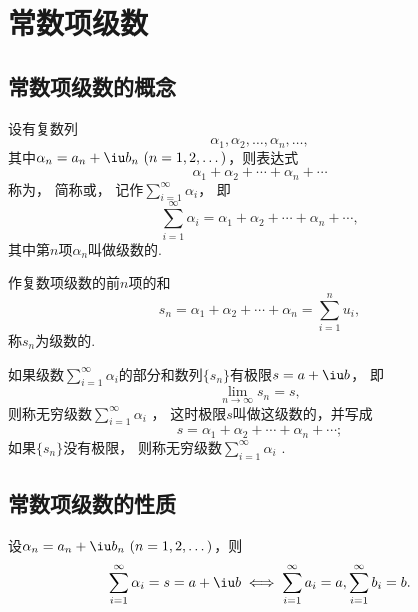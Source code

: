 \section{常数项级数}
\subsection{常数项级数的概念}
\begin{definition}
设有复数列\begin{equation*}
	\alpha_1,\alpha_2,\dotsc,\alpha_n,\dotsc,
\end{equation*}
其中\(\alpha_n=a_n+\iu b_n\ (n=1,2,\dotsc)\)，则表达式\begin{equation*}
	\alpha_1+\alpha_2+\dotsb+\alpha_n+\dotsb
\end{equation*}
称为，
简称或，
记作\(\sum_{i=1}^\infty \alpha_i\)，
即\begin{equation*}
	\sum_{i=1}^\infty \alpha_i = \alpha_1+\alpha_2+\dotsb+\alpha_n+\dotsb,
\end{equation*}
其中第\(n\)项\(\alpha_n\)叫做级数的.

作复数项级数的前\(n\)项的和\begin{equation*}
	s_n = \alpha_1+\alpha_2+\dotsb+\alpha_n = \sum_{i=1}^n{u_i},
\end{equation*}
称\(s_n\)为级数的.

如果级数\(\sum_{i=1}^\infty \alpha_i\)的部分和数列\(\{s_n\}\)有极限\(s=a+\iu b\)，
即\begin{equation*}
	\lim_{n\to\infty}s_n = s,
\end{equation*}
则称无穷级数\(\sum_{i=1}^\infty \alpha_i\) ，
这时极限\(s\)叫做这级数的，并写成\begin{equation*}
	s = \alpha_1+\alpha_2+\dotsb+\alpha_n+\dotsb;
\end{equation*}
如果\(\{s_n\}\)没有极限，
则称无穷级数\(\sum_{i=1}^\infty \alpha_i\) .
\end{definition}

\subsection{常数项级数的性质}
\begin{theorem}\label{theorem:解析函数的级数表示.复级数与其实部及虚部级数的关系}
设\(\alpha_n=a_n+\iu b_n\ (n=1,2,\dots)\)，则\begin{equation*}
	\sum_{i=1}^\infty \alpha_i = s = a + \iu b
	\iff
	\sum_{i=1}^\infty a_i = a,
	\sum_{i=1}^\infty b_i = b.
\end{equation*}
\end{theorem}

